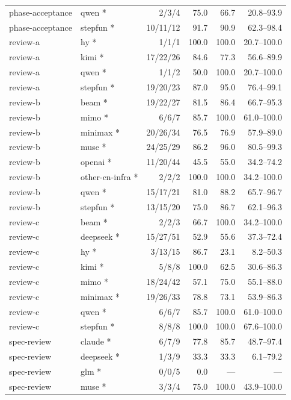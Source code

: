\documentclass[
  10pt,
  a4paper,
]{article}
\begin{document}
\begin{longtable}[]{@{}llrrrr@{}}
phase-acceptance & qwen * & 2/3/4 & 75.0 & 66.7 & 20.8--93.9 \\
phase-acceptance & stepfun * & 10/11/12 & 91.7 & 90.9 & 62.3--98.4 \\
review-a & hy * & 1/1/1 & 100.0 & 100.0 & 20.7--100.0 \\
review-a & kimi * & 17/22/26 & 84.6 & 77.3 & 56.6--89.9 \\
review-a & qwen * & 1/1/2 & 50.0 & 100.0 & 20.7--100.0 \\
review-a & stepfun * & 19/20/23 & 87.0 & 95.0 & 76.4--99.1 \\
review-b & beam * & 19/22/27 & 81.5 & 86.4 & 66.7--95.3 \\
review-b & mimo * & 6/6/7 & 85.7 & 100.0 & 61.0--100.0 \\
review-b & minimax * & 20/26/34 & 76.5 & 76.9 & 57.9--89.0 \\
review-b & muse * & 24/25/29 & 86.2 & 96.0 & 80.5--99.3 \\
review-b & openai * & 11/20/44 & 45.5 & 55.0 & 34.2--74.2 \\
review-b & other-cn-infra * & 2/2/2 & 100.0 & 100.0 & 34.2--100.0 \\
review-b & qwen * & 15/17/21 & 81.0 & 88.2 & 65.7--96.7 \\
review-b & stepfun * & 13/15/20 & 75.0 & 86.7 & 62.1--96.3 \\
review-c & beam * & 2/2/3 & 66.7 & 100.0 & 34.2--100.0 \\
review-c & deepseek * & 15/27/51 & 52.9 & 55.6 & 37.3--72.4 \\
review-c & hy * & 3/13/15 & 86.7 & 23.1 & 8.2--50.3 \\
review-c & kimi * & 5/8/8 & 100.0 & 62.5 & 30.6--86.3 \\
review-c & mimo * & 18/24/42 & 57.1 & 75.0 & 55.1--88.0 \\
review-c & minimax * & 19/26/33 & 78.8 & 73.1 & 53.9--86.3 \\
review-c & qwen * & 6/6/7 & 85.7 & 100.0 & 61.0--100.0 \\
review-c & stepfun * & 8/8/8 & 100.0 & 100.0 & 67.6--100.0 \\
spec-review & claude * & 6/7/9 & 77.8 & 85.7 & 48.7--97.4 \\
spec-review & deepseek * & 1/3/9 & 33.3 & 33.3 & 6.1--79.2 \\
spec-review & glm * & 0/0/5 & 0.0 & --- & --- \\
spec-review & muse * & 3/3/4 & 75.0 & 100.0 & 43.9--100.0 \\

\end{longtable}
\end{document}
